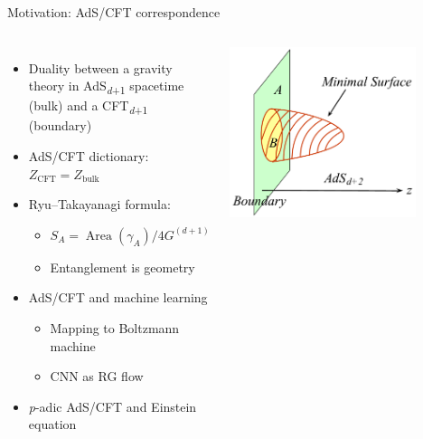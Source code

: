 \documentclass{fdubeamer}
\newcommand{\1}{\mathbb{1}}
\begin{document}
\begin{frame}{Motivation: AdS/CFT correspondence}

\begin{columns}[c]


    \begin{itemize}
      \item Duality between a gravity theory in AdS\textsubscript{\textit{d}+1} spacetime (bulk) and a CFT\textsubscript{\textit{d}+1} (boundary)
      \item AdS/CFT dictionary: $Z_{\mathrm{CFT}}=Z_{\mathrm{bulk}}$
      \item Ryu--Takayanagi formula:

        \begin{itemize}
          \item $S_A = \operatorname{Area}(\gamma_A) / 4G^{(d+1)}$
          \item Entanglement is geometry
        \end{itemize}

      \item AdS/CFT and machine learning

        \begin{itemize}
          \item Mapping to Boltzmann machine
          \item CNN as RG flow
        \end{itemize}

      \item \textit{p}-adic AdS/CFT and Einstein equation
    \end{itemize}


    \centering
    \includegraphics[width=0.8\textwidth]{images/rt-formula.pdf}

\end{columns}


\end{frame}
\end{document}
